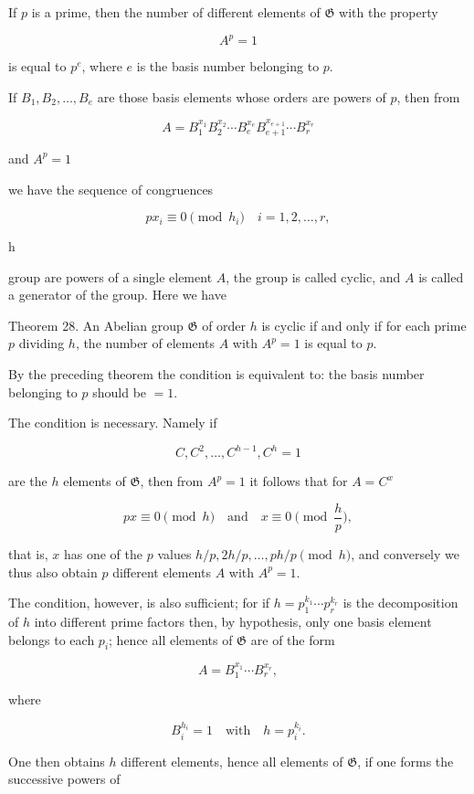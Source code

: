 If $p$ is a prime, then the number of different elements of $\mathfrak{G}$ with the property

$$A^p = 1$$

is equal to $p^e$, where $e$ is the basis number belonging to $p$.

If $B_1, B_2, \ldots, B_e$ are those basis elements whose orders are powers of $p$, then from

$$A = B_1^{x_1} B_2^{x_2} \cdots B_e^{x_e} B_{e+1}^{x_{e+1}} \cdots B_r^{x_r}$$

and $A^p = 1$

we have the sequence of congruences

$$px_i \equiv 0 \pmod{h_i} \quad i = 1, 2, \ldots, r,$$

h

group are powers of a single element $A$, the group is called cyclic, and $A$ is called a generator of the group. Here we have

Theorem 28. An Abelian group $\mathfrak{G}$ of order $h$ is cyclic if and only if for each prime $p$ dividing $h$, the number of elements $A$ with $A^p = 1$ is equal to $p$.

By the preceding theorem the condition is equivalent to: the basis number belonging to $p$ should be $= 1$.

The condition is necessary. Namely if

$$C, C^2, \ldots, C^{h-1}, C^h = 1$$

are the $h$ elements of $\mathfrak{G}$, then from $A^p = 1$ it follows that for $A = C^x$

$$px \equiv 0 \pmod{h} \quad \text{and} \quad x \equiv 0 \pmod{\frac{h}{p}},$$

that is, $x$ has one of the $p$ values $h/p, 2h/p, \ldots, ph/p \pmod{h}$, and conversely we thus also obtain $p$ different elements $A$ with $A^p = 1$.

The condition, however, is also sufficient; for if $h = p_1^{k_1} \cdots p_r^{k_r}$ is the decomposition of $h$ into different prime factors then, by hypothesis, only one basis element belongs to each $p_i$; hence all elements of $\mathfrak{G}$ are of the form

$$A = B_1^{x_1} \cdots B_r^{x_r},$$

where

$$B_i^{h_i} = 1 \quad \text{with} \quad h = p_i^{k_i}.$$

One then obtains $h$ different elements, hence all elements of $\mathfrak{G}$, if one forms the successive powers of

